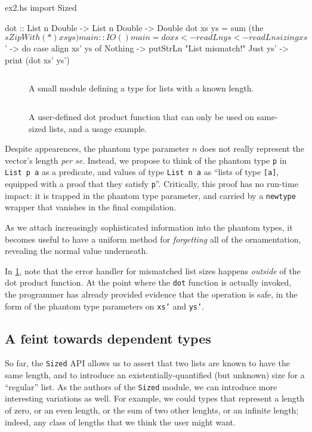 \documentclass[format=sigplan, review=false, screen=true]{acmart}
\begin{document}
\begin{filecontents*}{ex2.hs}
import Sized

dot :: List n Double -> List n Double -> Double
dot xs ys = sum (the $ sZipWith (*) xs ys)

main :: IO ()
main = do
  xs <- readLn
  ys <- readLn
  sizing xs $ \xs' -> do
    case align xs' ys of
      Nothing  -> putStrLn "List mismatch!"
      Just ys' -> print (dot xs' ys')
\end{filecontents*}

\begin{figure}
    \inputminted{haskell}{ex1.hs}
  \caption{A small module defining a type for lists with a known length.}
\end{figure}
\begin{figure}
    \inputminted{haskell}{ex2.hs}
    \caption{A user-defined dot product function that can only be used on same-sized lists,
    and a usage example. \label{dot-product}}
\end{figure}

Despite  appearences, the phantom type parameter $n$ does not really represent the vector's length
{\em per se}. Instead, we propose to think of the phantom type \texttt{p} in \texttt{List p a} as a predicate,
and values of type \texttt{List n a} as ``lists of type \texttt{[a]}, equipped with a proof
that they satisfy \texttt{p}''. Critically, this proof has no run-time impact: it is trapped in the
phantom type parameter, and carried by a \texttt{newtype} wrapper that vanishes in
the final compilation.


As we attach increasingly sophisticated information into the phantom types, it becomes useful to
have a uniform method for \emph{forgetting} all of the ornamentation, revealing the normal
value underneath.

In \cref{dot-product}, note that the error handler for mismatched list sizes happens
\emph{outside} of the dot product function. At the point where the \texttt{dot} function
is actually invoked, the programmer has already provided evidence that the operation is
safe, in the form of the phantom type parameters on \texttt{xs'} and \texttt{ys'}.

\subsection{A feint towards dependent types}
So far, the \texttt{Sized} API allows us to assert that two lists are known to have the same
length, and to introduce an existentially-quantified (but unknown) size for a ``regular'' list.
As the authors of the \texttt{Sized} module, we can introduce more interesting variations as
well. For example, we could types that represent a length of zero, or an even length, or the
sum of two other lenghts, or an infinite length; indeed, any class of lengths that we
think the user might want.
\end{document}

